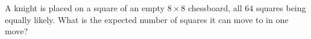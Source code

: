 A knight is placed on a square of an empty $8\times8$ chessboard, all $64$ squares being equally likely. What is the expected number of squares it can move to in one move?
